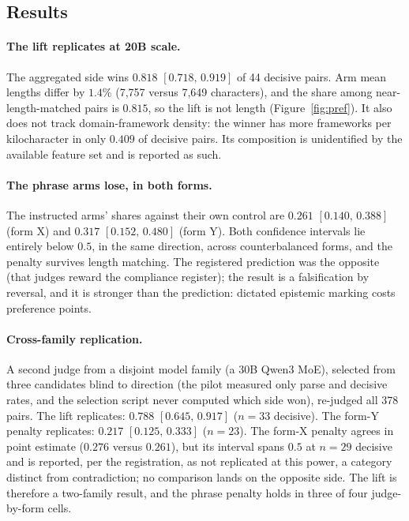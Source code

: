 \documentclass[11pt]{article}
\newcommand{\ci}[2]{\ensuremath{[#1,\,#2]}}
\begin{document}
\subsection{Results}

\paragraph{The lift replicates at 20B scale.} The aggregated side wins
$0.818$ \ci{0.718}{0.919} of 44 decisive pairs. Arm mean lengths differ
by $1.4\%$ (7{,}757 versus 7{,}649 characters), and the share among
near-length-matched pairs is $0.815$, so the lift is not length
(Figure~\ref{fig:pref}). It also does not track domain-framework
density: the winner has more frameworks per kilocharacter in only
$0.409$ of decisive pairs. Its composition is unidentified by the
available feature set and is reported as such.

\paragraph{The phrase arms lose, in both forms.} The instructed arms'
shares against their own control are $0.261$ \ci{0.140}{0.388} (form
X) and $0.317$ \ci{0.152}{0.480} (form Y). Both confidence intervals
lie entirely below $0.5$, in the same direction, across counterbalanced
forms, and the penalty survives length matching. The registered
prediction was the opposite (that judges reward the compliance
register); the result is a falsification by reversal, and it is
stronger than the prediction: dictated epistemic marking costs
preference points.

\paragraph{Cross-family replication.} A second judge from a disjoint
model family (a 30B Qwen3 MoE), selected from three candidates blind to
direction (the pilot measured only parse and decisive rates, and the
selection script never computed which side won), re-judged all 378
pairs. The lift replicates: $0.788$ \ci{0.645}{0.917} ($n{=}33$
decisive). The form-Y penalty replicates: $0.217$ \ci{0.125}{0.333}
($n{=}23$). The form-X penalty agrees in point estimate ($0.276$ versus
$0.261$), but its interval spans $0.5$ at $n{=}29$ decisive and is
reported, per the registration, as not replicated at this power, a
category distinct from contradiction; no comparison lands on the
opposite side. The lift is therefore a two-family result, and the
phrase penalty holds in three of four judge-by-form cells.
\end{document}

